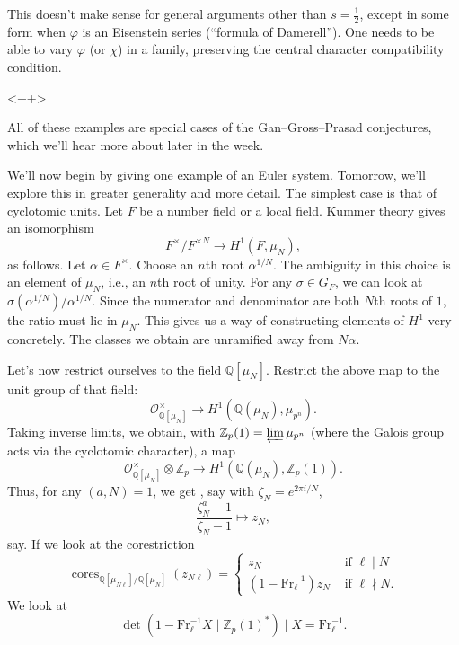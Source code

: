 \documentclass[reqno]{amsart} 
\begin{document}
\begin{remark}
  This doesn't make sense for general arguments other than $s = \tfrac{1}{2}$, except in some form when $\varphi$ is an Eisenstein series (``formula of Damerell'').  One needs to be able to vary $\varphi$ (or $\chi$) in a family, preserving the central character compatibility condition.
\end{remark}<++>

All of these examples are special cases of the Gan--Gross--Prasad conjectures, which we'll hear more about later in the week.

We'll now begin by giving one example of an Euler system.  Tomorrow, we'll explore this in greater generality and more detail.  The simplest case is that of cyclotomic units.  Let $F$ be a number field or a local field.  Kummer theory gives an isomorphism
\begin{equation*}
  F^\times / F^{\times N} \rightarrow H^1(F, \mu_N),
\end{equation*}
as follows.  Let $\alpha \in F^\times$.  Choose an $n$th root $\alpha^{1/N}$.  The ambiguity in this choice is an element of $\mu_N$, i.e., an $n$th root of unity.  For any $\sigma \in G_F$, we can look at $\sigma(\alpha^{1/N}) / \alpha^{1/N}$.  Since the numerator and denominator are both $N$th roots of $1$, the ratio must lie in $\mu_N$.  This gives us a way of constructing elements of $H^1$ very concretely.  The classes we obtain are unramified away from $N \alpha$.

Let's now restrict ourselves to the field $\mathbb{Q}[\mu_N]$.  Restrict the above map to the unit group of that field:
\begin{equation*}
  \mathcal{O}_{\mathbb{Q}[\mu_N]}^\times \rightarrow H^1(\mathbb{Q}(\mu_N), \mu_{p^n}).
\end{equation*}
Taking inverse limits, we obtain, with $\mathbb{Z}_p(1) = \varprojlim\mu_{p^n}$ (where the Galois group acts via the cyclotomic character), a map
\begin{equation*}
  \mathcal{O}_{\mathbb{Q}[\mu_N]}^\times \otimes \mathbb{Z}_p \rightarrow H^1(\mathbb{Q}(\mu_N), \mathbb{Z}_p(1)).
\end{equation*}
Thus, for any $(a, N) = 1$, we get , say with $\zeta_N = e^{2 \pi i / N}$,
\begin{equation*}
  \frac{\zeta_N^a - 1}{\zeta_N - 1} \mapsto z_N,
\end{equation*}
say.  If we look at the corestriction
\begin{equation*}
  \operatorname{cores}_{\mathbb{Q}[\mu_{N \ell}] / \mathbb{Q}[\mu_N]}(z_{N \ell}) =
  \begin{cases}
    z_N    
    & \text{ if } \ell \mid N \\
    (1 - \mathrm{Fr}_{\ell}^{-1}) z_N
                                                                                     & \text{ if } \ell \nmid N.
  \end{cases}
\end{equation*}
We look at
\begin{equation*}
  \det \left( 1 - \mathrm{Fr}_{\ell}^{-1} X \mid \mathbb{Z}_p(1)^\ast \right) \mid X = \mathrm{Fr}_{\ell}^{-1}.
\end{equation*}
\end{document}
